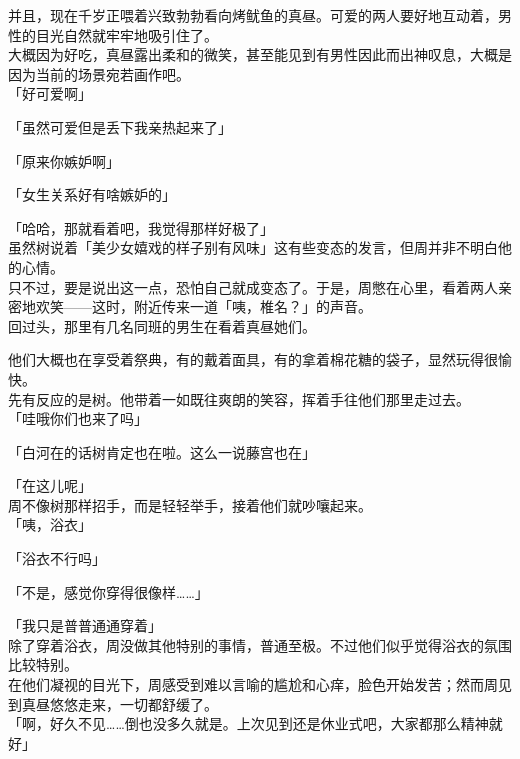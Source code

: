 并且，现在千岁正喂着兴致勃勃看向烤鱿鱼的真昼。可爱的两人要好地互动着，男性的目光自然就牢牢地吸引住了。\\

大概因为好吃，真昼露出柔和的微笑，甚至能见到有男性因此而出神叹息，大概是因为当前的场景宛若画作吧。\\

「好可爱啊」

「虽然可爱但是丢下我亲热起来了」

「原来你嫉妒啊」

「女生关系好有啥嫉妒的」

「哈哈，那就看着吧，我觉得那样好极了」\\

虽然树说着「美少女嬉戏的样子别有风味」这有些变态的发言，但周并非不明白他的心情。\\

只不过，要是说出这一点，恐怕自己就成变态了。于是，周憋在心里，看着两人亲密地欢笑——这时，附近传来一道「咦，椎名？」的声音。\\

回过头，那里有几名同班的男生在看着真昼她们。

他们大概也在享受着祭典，有的戴着面具，有的拿着棉花糖的袋子，显然玩得很愉快。\\

先有反应的是树。他带着一如既往爽朗的笑容，挥着手往他们那里走过去。\\

「哇哦你们也来了吗」

「白河在的话树肯定也在啦。这么一说藤宫也在」

「在这儿呢」\\

周不像树那样招手，而是轻轻举手，接着他们就吵嚷起来。\\

「咦，浴衣」

「浴衣不行吗」

「不是，感觉你穿得很像样……」

「我只是普普通通穿着」\\

除了穿着浴衣，周没做其他特别的事情，普通至极。不过他们似乎觉得浴衣的氛围比较特别。\\

在他们凝视的目光下，周感受到难以言喻的尴尬和心痒，脸色开始发苦；然而周见到真昼悠悠走来，一切都舒缓了。\\

「啊，好久不见……倒也没多久就是。上次见到还是休业式吧，大家都那么精神就好」

